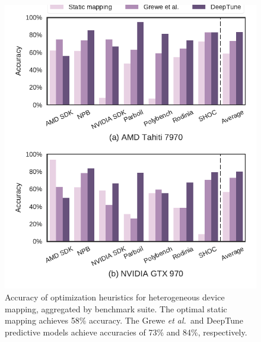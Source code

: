 \begin{figure}
  \centering %
  \includegraphics[width=\columnwidth]{img/cgo-acc}%
  \caption{%
    Accuracy of optimization heuristics for heterogeneous device mapping,
    aggregated by benchmark suite. The optimal static mapping achieves 58\%
    accuracy. The Grewe \emph{et al.\ }and DeepTune predictive models achieve
    accuracies of 73\% and 84\%, respectively.%
  }
  \label{fig:cgo-accuracy}
\end{figure}
